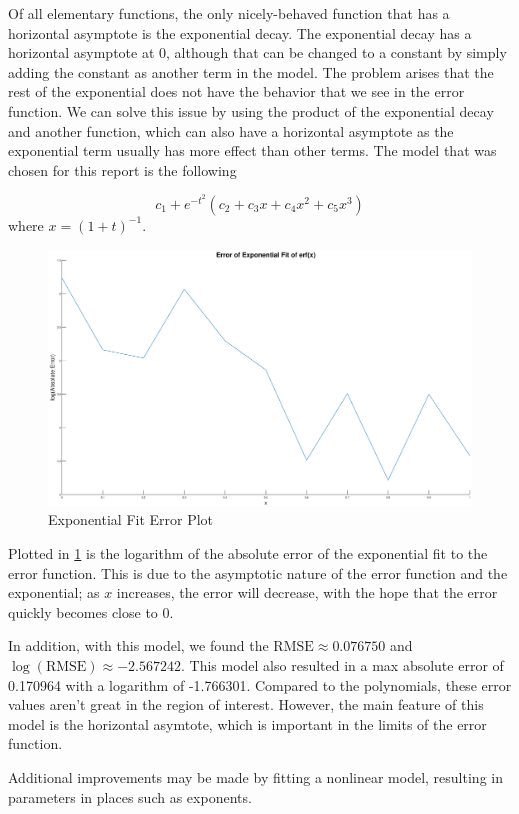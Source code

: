 \documentclass[10pt,a4paper]{article}
\begin{document}
\begin{multicols*}{2}
Of all elementary functions, the only nicely-behaved function that has a horizontal asymptote is the exponential decay. The exponential decay has a horizontal asymptote at $0$, although that can be changed to a constant by simply adding the constant as another term in the model. The problem arises that the rest of the exponential does not have the behavior that we see in the error function. We can solve this issue by using the product of the exponential decay and another function, which can also have a horizontal asymptote as the exponential term usually has more effect than other terms. The model that was chosen for this report is the following

\begin{equation}
c_1 + e^{-t^2} \left( c_2 + c_3 x + c_4 x^2 + c_5 x^3 \right)
\label{eqn: exponential model}
\end{equation}
where $x = \left( 1 + t \right)^{-1}$.

\begin{figure}[H]
\includegraphics[width=\columnwidth]{Figures/experror.eps}
\caption{Exponential Fit Error Plot}
\label{fig: experrors}
\end{figure}

Plotted in \cref{fig: experrors} is the logarithm of the absolute error of the exponential fit to the error function. This is due to the asymptotic nature of the error function and the exponential; as $x$ increases, the error will decrease, with the hope that the error quickly becomes close to 0.

In addition, with this model, we found  the $\text{RMSE} \approx 0.076750$ and $\log{(\text{RMSE})} \approx -2.567242$. This model also resulted in a max absolute error of 0.170964 with a logarithm of -1.766301. Compared to the polynomials, these error values aren't great in the region of interest. However, the main feature of this model is the horizontal asymtote, which is important in the limits of the error function.

Additional improvements may be made by fitting a nonlinear model, resulting in parameters in places such as exponents.

\end{multicols*}
\end{document}
